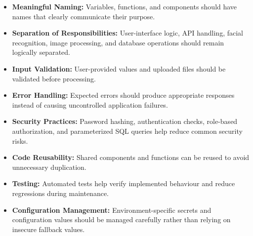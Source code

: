 
\begin{itemize}
    \item \textbf{Meaningful Naming:} Variables, functions, and components should have names that clearly communicate their purpose.
    \item \textbf{Separation of Responsibilities:} User-interface logic, API handling, facial recognition, image processing, and database operations should remain logically separated.
    \item \textbf{Input Validation:} User-provided values and uploaded files should be validated before processing.
    \item \textbf{Error Handling:} Expected errors should produce appropriate responses instead of causing uncontrolled application failures.
    \item \textbf{Security Practices:} Password hashing, authentication checks, role-based authorization, and parameterized SQL queries help reduce common security risks.
    \item \textbf{Code Reusability:} Shared components and functions can be reused to avoid unnecessary duplication.
    \item \textbf{Testing:} Automated tests help verify implemented behaviour and reduce regressions during maintenance.
    \item \textbf{Configuration Management:} Environment-specific secrets and configuration values should be managed carefully rather than relying on insecure fallback values.
\end{itemize}





